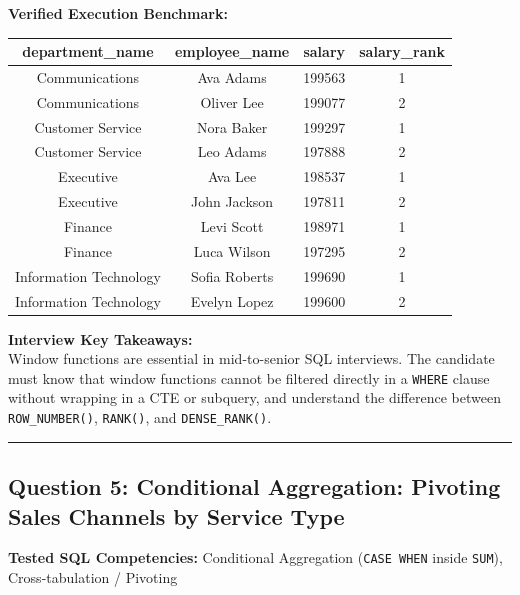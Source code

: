 \documentclass[11pt,a4paper]{article}
\begin{document}
\vspace{0.15cm}
\noindent\textbf{Verified Execution Benchmark:}
\begin{center}
\small
\begin{tabular}{cccc}
\toprule
\textbf{department\_name} & \textbf{employee\_name} & \textbf{salary} & \textbf{salary\_rank} \\
\midrule
Communications & Ava Adams & 199563 & 1 \\
Communications & Oliver Lee & 199077 & 2 \\
Customer Service & Nora Baker & 199297 & 1 \\
Customer Service & Leo Adams & 197888 & 2 \\
Executive & Ava Lee & 198537 & 1 \\
Executive & John Jackson & 197811 & 2 \\
Finance & Levi Scott & 198971 & 1 \\
Finance & Luca Wilson & 197295 & 2 \\
Information Technology & Sofia Roberts & 199690 & 1 \\
Information Technology & Evelyn Lopez & 199600 & 2 \\
\bottomrule
\end{tabular}
\end{center}

\vspace{0.15cm}
\noindent\textbf{Interview Key Takeaways:} \\
Window functions are essential in mid-to-senior SQL interviews. The candidate must know that window functions cannot be filtered directly in a \texttt{WHERE} clause without wrapping in a CTE or subquery, and understand the difference between \texttt{ROW\_NUMBER()}, \texttt{RANK()}, and \texttt{DENSE\_RANK()}.

\vspace{0.4cm}
\noindent\rule{\textwidth}{0.4pt}
\vspace{0.4cm}

\subsection*{Question 5: Conditional Aggregation: Pivoting Sales Channels by Service Type}

\noindent\textbf{Tested SQL Competencies:} Conditional Aggregation (\texttt{CASE WHEN} inside \texttt{SUM}), Cross-tabulation / Pivoting
\end{document}
